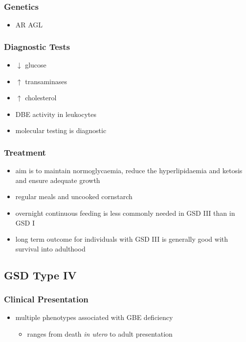 \documentclass{scrartcl}
\begin{document}
\subsubsection{Genetics}
\label{sec:org03d4326}
\begin{itemize}
\item AR AGL
\end{itemize}
\subsubsection{Diagnostic Tests}
\label{sec:org8d8f22b}
\begin{itemize}
\item \(\downarrow\) glucose
\item \(\uparrow\) transaminases
\item \(\uparrow\) cholesterol
\item DBE activity in leukocytes
\item molecular testing is diagnostic
\end{itemize}
\subsubsection{Treatment}
\label{sec:org544d3dd}
\begin{itemize}
\item aim is to maintain normoglycaemia, reduce the hyperlipidaemia and ketosis and
ensure adequate growth
\item regular meals and uncooked cornstarch
\item overnight continuous feeding is less commonly needed in GSD III than
in GSD I
\item long term outcome for individuals with GSD III is generally good
with survival into adulthood
\end{itemize}
\subsection{GSD Type IV}
\label{sec:org8e17108}
\subsubsection{Clinical Presentation}
\label{sec:orgb8f9cb7}
\begin{itemize}
\item multiple phenotypes associated with GBE deficiency
\begin{itemize}
\item ranges from death \emph{in utero} to adult presentation
\end{itemize}
\end{itemize}
\end{document}
